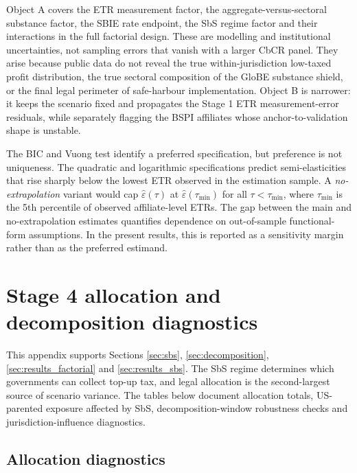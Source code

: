 \documentclass[11pt,a4paper]{article}
\begin{document}
Object A covers the ETR measurement factor, the aggregate-versus-sectoral substance factor, the SBIE rate endpoint, the SbS regime factor and their interactions in the full factorial design. These are modelling and institutional uncertainties, not sampling errors that vanish with a larger CbCR panel. They arise because public data do not reveal the true within-jurisdiction low-taxed profit distribution, the true sectoral composition of the GloBE substance shield, or the final legal perimeter of safe-harbour implementation. Object B is narrower: it keeps the scenario fixed and propagates the Stage 1 ETR measurement-error residuals, while separately flagging the BSPI affiliates whose anchor-to-validation shape is unstable.

The BIC and Vuong test identify a preferred specification, but preference is not uniqueness. The quadratic and logarithmic specifications predict semi-elasticities that rise sharply below the lowest ETR observed in the estimation sample. A \emph{no-extrapolation} variant would cap $\hat{\varepsilon}(\tau)$ at $\hat{\varepsilon}(\tau_{\min})$ for all $\tau < \tau_{\min}$, where $\tau_{\min}$ is the 5th percentile of observed affiliate-level ETRs. The gap between the main and no-extrapolation estimates quantifies dependence on out-of-sample functional-form assumptions. In the present results, this is reported as a sensitivity margin rather than as the preferred estimand.

\section{Stage 4 allocation and decomposition diagnostics}\label{app:stage4_allocation}

This appendix supports Sections \ref{sec:sbs}, \ref{sec:decomposition}, \ref{sec:results_factorial} and \ref{sec:results_sbs}. The SbS regime determines which governments can collect top-up tax, and legal allocation is the second-largest source of scenario variance. The tables below document allocation totals, US-parented exposure affected by SbS, decomposition-window robustness checks and jurisdiction-influence diagnostics.

\subsection{Allocation diagnostics}\label{app:results_stage45}
\end{document}
